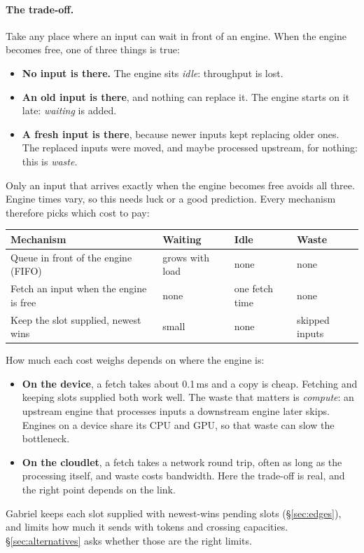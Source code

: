 \documentclass[11pt]{article}
\begin{document}
\paragraph{The trade-off.} Take any place where an input can wait in front of
an engine. When the engine becomes free, one of three things is true:
\begin{itemize}[nosep]
  \item \textbf{No input is there.} The engine sits \emph{idle}: throughput
        is lost.
  \item \textbf{An old input is there}, and nothing can replace it. The
        engine starts on it late: \emph{waiting} is added.
  \item \textbf{A fresh input is there}, because newer inputs kept replacing
        older ones. The replaced inputs were moved, and maybe processed
        upstream, for nothing: this is \emph{waste}.
\end{itemize}
Only an input that arrives exactly when the engine becomes free avoids all
three. Engine times vary, so this needs luck or a good prediction. Every
mechanism therefore picks which cost to pay:
\begin{center}
\small
\begin{tabular}{@{}llll@{}}
\toprule
Mechanism & Waiting & Idle & Waste \\
\midrule
Queue in front of the engine (FIFO) & grows with load & none & none \\
Fetch an input when the engine is free & none & one fetch time & none \\
Keep the slot supplied, newest wins & small & none & skipped inputs \\
\bottomrule
\end{tabular}
\end{center}
How much each cost weighs depends on where the engine is:
\begin{itemize}[nosep]
  \item \textbf{On the device}, a fetch takes about 0.1\,ms and a copy is
        cheap. Fetching and keeping slots supplied both work well. The waste
        that matters is \emph{compute}: an upstream engine that processes
        inputs a downstream engine later skips. Engines on a device share
        its CPU and GPU, so that waste can slow the bottleneck.
  \item \textbf{On the cloudlet}, a fetch takes a network round trip, often
        as long as the processing itself, and waste costs bandwidth. Here the
        trade-off is real, and the right point depends on the link.
\end{itemize}
Gabriel keeps each slot supplied with newest-wins pending slots
(\S\ref{sec:edges}), and limits how much it sends with tokens and crossing
capacities. \S\ref{sec:alternatives} asks whether those are the right limits.
\end{document}
